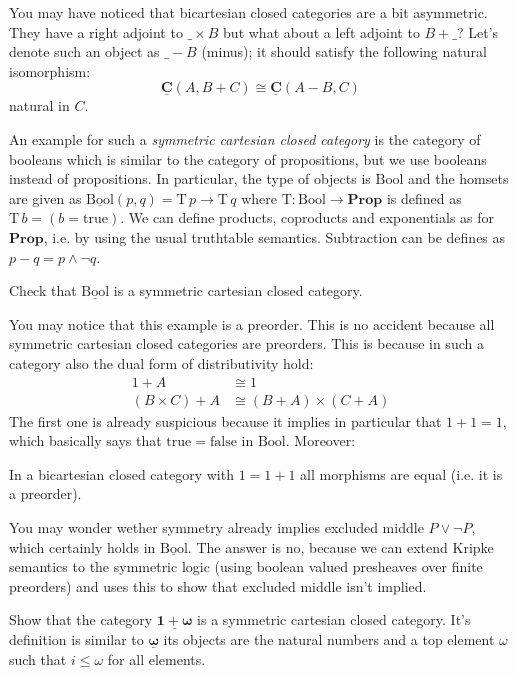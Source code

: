 \documentclass{article}
\newcommand{\Prop}{\mathbf{Prop}}
\newcommand{\Bool}{\mathrm{Bool}}
\newcommand{\true}{\mathrm{true}}
\newcommand{\false}{\mathrm{false}}
\newcommand{\T}{\mathrm{T}}
\newcommand{\cat}[1]{\underline{\mathbf{#1}}}
\newcommand{\homC}[3]{\cat{#1}(#2,#3)}
\begin{document}
You may have noticed that bicartesian closed categories are a bit asymmetric. They have a right adjoint to $\_\times B$ but what about a left adjoint to $B+\_$? Let's denote such an object as $\_- B$ (minus); it should satisfy the following natural isomorphism:
\[ \homC{C}{A}{B+C} \cong \homC{C}{A - B}{C} \]
natural in $C$. 

An example for such a \emph{symmetric cartesian closed category} is the category of booleans which is similar to the category of propositions, but we use booleans instead of propositions. In particular, the type of objects is $\Bool$ and the homsets are given as 
$\homC{\Bool}{p}{q} = \T\,p \to \T\,q$ where $\T : \Bool \to \Prop$ is defined as $\T\,b = (b = \true)$. We can define products, coproducts and exponentials as for $\Prop$, i.e. by using the usual truthtable semantics. Subtraction can be defines as $p-q = p \wedge \neg q$.
\begin{Exercise}
  Check that $\cat{\Bool}$ is a symmetric cartesian closed category.
\end{Exercise}
You may notice that this example is a preorder. This is no accident because all symmetric cartesian closed categories are preorders. This is because in such a category also the dual form of distributivity hold:
\begin{align*}
  1 +  A & \cong 1 \\
  (B \times C) + A & \cong (B + A) \times (C + A)
\end{align*}
The first one is already suspicious because it implies in particular that $1+1 = 1$, which basically says that $\true = \false$ in $\Bool$. Moreover:
\begin{Exercise}
  In a bicartesian closed category with $1 = 1+1$ all morphisms are equal (i.e. it is a preorder). 
\end{Exercise}
You may wonder wether symmetry already implies excluded middle $P \vee \neg P$, which certainly holds in $\cat{\Bool}$. The answer is no, because we can extend Kripke semantics to the symmetric logic (using boolean valued presheaves over finite preorders) and uses this to show that excluded middle isn't implied. 

\begin{Exercise}
  Show that the category $\cat{1+\omega}$ is a symmetric cartesian closed category. It's definition is similar to $\cat{\omega}$ its objects are the natural numbers and a top element $\omega$ such that $i \leq \omega$ for all elements.
\end{Exercise}
\end{document}
